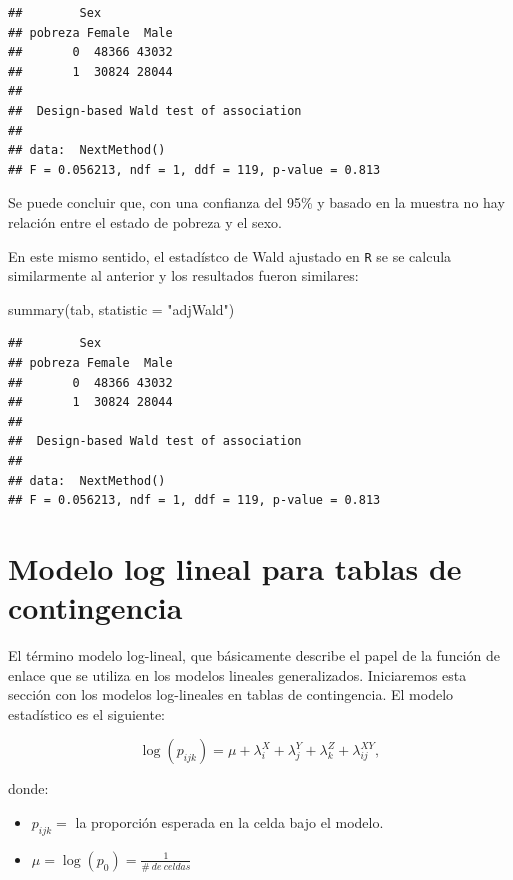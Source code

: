 \documentclass[
  12pt,
]{book}
\newenvironment{Shaded}{\begin{snugshade}}{\end{snugshade}}
\newcommand{\AttributeTok}[1]{\textcolor[rgb]{0.77,0.63,0.00}{#1}}
\newcommand{\FunctionTok}[1]{\textcolor[rgb]{0.00,0.00,0.00}{#1}}
\newcommand{\NormalTok}[1]{#1}
\newcommand{\StringTok}[1]{\textcolor[rgb]{0.31,0.60,0.02}{#1}}
\begin{document}
\begin{verbatim}
##        Sex
## pobreza Female  Male
##       0  48366 43032
##       1  30824 28044
## 
##  Design-based Wald test of association
## 
## data:  NextMethod()
## F = 0.056213, ndf = 1, ddf = 119, p-value = 0.813
\end{verbatim}

Se puede concluir que, con una confianza del 95\% y basado en la muestra no hay relación entre el estado de pobreza y el sexo.

En este mismo sentido, el estadístco de Wald ajustado en \texttt{R} se se calcula similarmente al anterior y los resultados fueron similares:

\begin{Shaded}
\begin{Highlighting}[]
\FunctionTok{summary}\NormalTok{(tab, }\AttributeTok{statistic =} \StringTok{"adjWald"}\NormalTok{)}
\end{Highlighting}
\end{Shaded}

\begin{verbatim}
##        Sex
## pobreza Female  Male
##       0  48366 43032
##       1  30824 28044
## 
##  Design-based Wald test of association
## 
## data:  NextMethod()
## F = 0.056213, ndf = 1, ddf = 119, p-value = 0.813
\end{verbatim}

\hypertarget{modelo-log-lineal-para-tablas-de-contingencia}{%
\section{Modelo log lineal para tablas de contingencia}\label{modelo-log-lineal-para-tablas-de-contingencia}}

El término modelo log-lineal, que básicamente describe el papel de la función de enlace que se utiliza en los modelos lineales generalizados. Iniciaremos esta sección con los modelos log-lineales en tablas de contingencia. El modelo estadístico es el siguiente:

\[
  \log(p_{ijk}) = \mu + \lambda_i^X + \lambda_j^Y + \lambda_k^Z + \lambda_{ij}^{XY}  ,   
\]

donde:

\begin{itemize}
\item
  \(p_{ijk}=\) la proporción esperada en la celda bajo el modelo.
\item
  \(\mu = \log(p_{0})=\frac{1}{\#\ de\ celdas}\)
\end{itemize}
\end{document}
